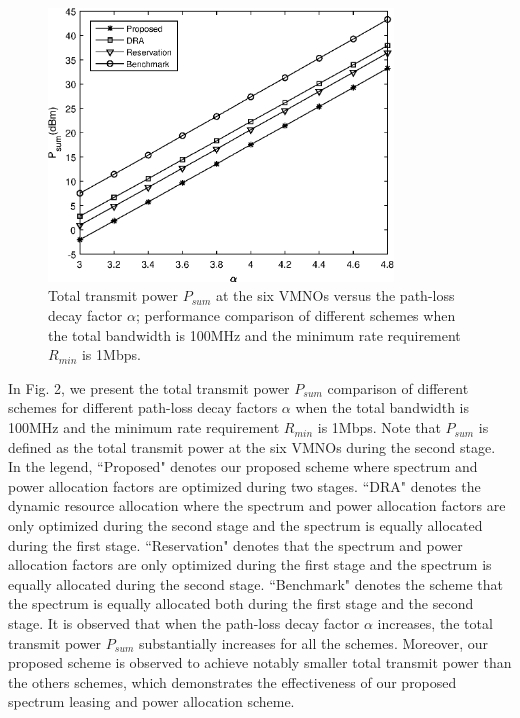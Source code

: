 \documentclass[journal]{IEEEtran}
\begin{document}
\begin{figure}
	\centering
	\includegraphics[width=3.6in]{P_alpha.eps}
	\caption{Total transmit power $P_{sum}$ at the six VMNOs versus the path-loss decay factor $\alpha$; performance comparison of different schemes when the total bandwidth is 100MHz and the minimum rate requirement $R_{min}$ is 1Mbps.}
\end{figure}
In Fig. 2, we present the total transmit power $P_{sum}$ comparison of different schemes for different path-loss decay factors $\alpha$ when the total bandwidth is 100MHz and the minimum rate requirement $R_{min}$ is 1Mbps. Note that $P_{sum}$ is defined as the total transmit power at the six VMNOs during the second stage. In the legend, ``Proposed" denotes our proposed scheme where spectrum and power allocation factors are optimized during two stages. ``DRA" denotes the dynamic resource allocation where the spectrum and power allocation factors are only optimized during the second stage and the spectrum is equally allocated during the first stage. ``Reservation" denotes that the spectrum and power allocation factors are only optimized during the first stage and the spectrum is equally allocated during the second stage. ``Benchmark" denotes the scheme that the spectrum is equally allocated both during the first stage and the second stage. It is observed that when the path-loss decay factor $\alpha$ increases, the total transmit power $P_{sum}$ substantially increases for all the schemes. Moreover, our proposed scheme is observed to achieve notably smaller total transmit power than the others schemes, which demonstrates the effectiveness of our proposed spectrum leasing and power allocation scheme.
\end{document}
